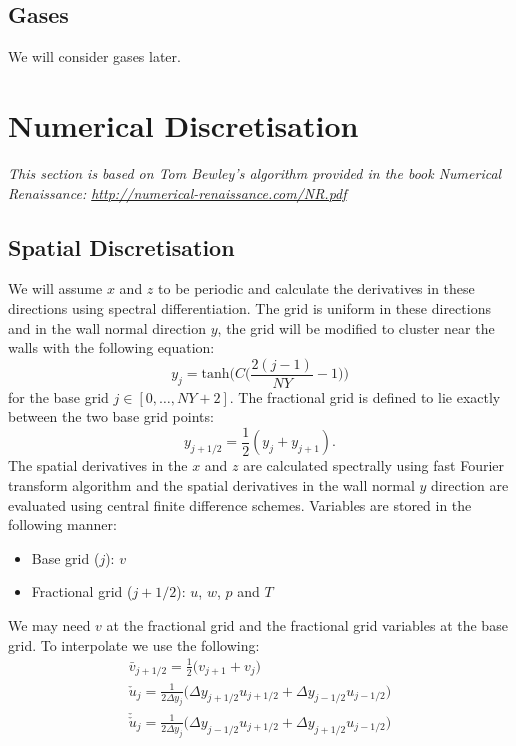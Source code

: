 \documentclass[preprint,12pt]{article}
\begin{document}
\subsection{Gases}
We will consider gases later.

 \section{Numerical Discretisation}
 \emph{This section is based on Tom Bewley's algorithm provided in the book Numerical Renaissance: \url{http://numerical-renaissance.com/NR.pdf}}
 \subsection{Spatial Discretisation}
We will assume $x$ and $z$ to be periodic and calculate the derivatives in these directions using spectral differentiation. The grid is uniform in these directions and in the wall normal direction $y$, the grid will be modified to cluster near the walls with the following equation:
\begin{equation}
y_j=\text{tanh}\Bigg(C\Big(\frac{2(j-1)}{NY}-1\Big)\Bigg)
\end{equation}
for the base grid $j\in[0,\dots, NY+2]$. The fractional grid is defined to lie exactly between the two base grid points:
\begin{equation}
y_{j+1/2}=\frac{1}{2}(y_j+y_{j+1}).
\end{equation}
The spatial derivatives in the $x$ and $z$ are calculated spectrally using fast Fourier transform algorithm and the spatial derivatives in the wall normal $y$ direction are evaluated using central finite difference schemes. Variables are stored in the following manner:
\begin{itemize}
	\item Base grid ($j$): $v$
	\item Fractional grid ($j+1/2$): $u$, $w$, $p$ and $T$ 
\end{itemize}
We may need $v$ at the fractional grid and the fractional grid variables at the base grid. To interpolate we use the following:
 \begin{subequations}\begin{align}
 \bar{v}_{j+1/2}=\frac{1}{2}\big(v_{j+1}+v_j\big)\\
 \check{u}_j=\frac{1}{2\Delta y_j}\big(\Delta y_{j+1/2}u_{j+1/2}+\Delta y_{j-1/2}u_{j-1/2}\big)\\ 	\check{\check{u}}_j=\frac{1}{2\Delta y_j}\big(\Delta y_{j-1/2}u_{j+1/2}+\Delta y_{j+1/2}u_{j-1/2}\big)
\end{align}\end{subequations} 	
\end{document}
